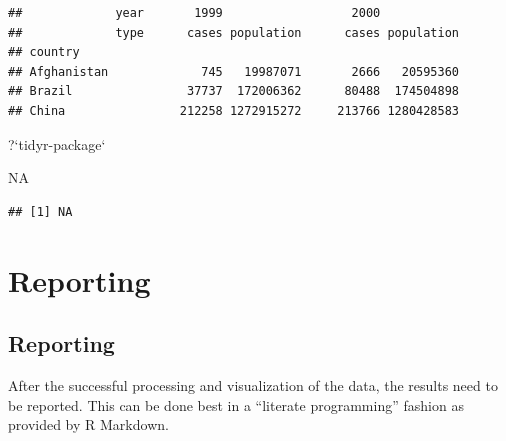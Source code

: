 \documentclass[]{book}
\newenvironment{Shaded}{}{}
\newcommand{\DataTypeTok}[1]{#1}
\newcommand{\KeywordTok}[1]{\textcolor[rgb]{0.00,0.00,1.00}{#1}}
\newcommand{\NormalTok}[1]{#1}
\newcommand{\OperatorTok}[1]{#1}
\newcommand{\OtherTok}[1]{\textcolor[rgb]{1.00,0.25,0.00}{#1}}
\newcommand{\StringTok}[1]{\textcolor[rgb]{0.00,0.50,0.50}{#1}}
\begin{document}
\begin{Shaded}
\end{Shaded}

\begin{verbatim}
##             year       1999                  2000           
##             type      cases population      cases population
## country                                                     
## Afghanistan             745   19987071       2666   20595360
## Brazil                37737  172006362      80488  174504898
## China                212258 1272915272     213766 1280428583
\end{verbatim}

\begin{Shaded}
\begin{Highlighting}[]
\NormalTok{?}\StringTok{`}\DataTypeTok{tidyr-package}\StringTok{`}
\end{Highlighting}
\end{Shaded}

\begin{Shaded}
\begin{Highlighting}[]
\OtherTok{NA}
\end{Highlighting}
\end{Shaded}

\begin{verbatim}
## [1] NA
\end{verbatim}

\hypertarget{part-reporting}{%
\part{Reporting}\label{part-reporting}}

\hypertarget{reporting}{%
\chapter{Reporting}\label{reporting}}

After the successful processing and visualization of the data, the results need to be reported.
This can be done best in a ``literate programming'' fashion as provided by R Markdown.
\end{document}
